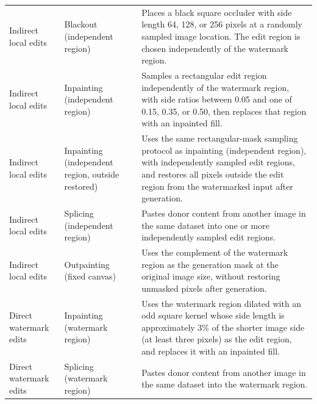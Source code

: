 {\begin{longtable}{@{}>{\raggedright\arraybackslash}p{} >{\raggedright\arraybackslash}p{} >{\raggedright\arraybackslash}p{}@{}}
\addlinespace[2pt]
Indirect local edits & Blackout (independent region) & Places a black square occluder with side length 64, 128, or 256 pixels at a randomly sampled image location. The edit region is chosen independently of the watermark region. \\
Indirect local edits & Inpainting (independent region) & Samples a rectangular edit region independently of the watermark region, with side ratios between 0.05 and one of 0.15, 0.35, or 0.50, then replaces that region with an inpainted fill. \\
Indirect local edits & Inpainting (independent region, outside restored) & Uses the same rectangular-mask sampling protocol as inpainting (independent region), with independently sampled edit regions, and restores all pixels outside the edit region from the watermarked input after generation. \\
Indirect local edits & Splicing (independent region) & Pastes donor content from another image in the same dataset into one or more independently sampled edit regions. \\
Indirect local edits & Outpainting (fixed canvas) & Uses the complement of the watermark region as the generation mask at the original image size, without restoring unmasked pixels after generation. \\
\addlinespace[2pt]
Direct watermark edits & Inpainting (watermark region) & Uses the watermark region dilated with an odd square kernel whose side length is approximately 3\% of the shorter image side (at least three pixels) as the edit region, and replaces it with an inpainted fill. \\
Direct watermark edits & Splicing (watermark region) & Pastes donor content from another image in the same dataset into the watermark region. \\
\end{longtable}
}
